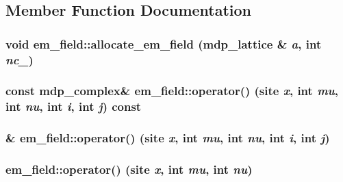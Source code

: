 \subsection{Member Function Documentation}
\hypertarget{classem__field_ae4f6727d2b31a8d7eec93bf3506c92fb}{
\subsubsection[{allocate\_\-em\_\-field}]{\setlength{\rightskip}{0pt plus 5cm}void em\_\-field::allocate\_\-em\_\-field ({\bf mdp\_\-lattice} \& {\em a}, \/  int {\em nc\_\-})}}
\label{classem__field_ae4f6727d2b31a8d7eec93bf3506c92fb}
\hypertarget{classem__field_a68b499892a9404f8b469677e28506180}{
\subsubsection[{operator()}]{\setlength{\rightskip}{0pt plus 5cm}const {\bf mdp\_\-complex}\& em\_\-field::operator() (site {\em x}, \/  int {\em mu}, \/  int {\em nu}, \/  int {\em i}, \/  int {\em j}) const}}
\label{classem__field_a68b499892a9404f8b469677e28506180}
\hypertarget{classem__field_ab5063637e3b890ae95ea46b8458c6fc7}{
\subsubsection[{operator()}]{\& em\_\-field::operator() (site {\em x}, \/  int {\em mu}, \/  int {\em nu}, \/  int {\em i}, \/  int {\em j})}}
\label{classem__field_ab5063637e3b890ae95ea46b8458c6fc7}
\hypertarget{classem__field_a4afce0ed26593545c4a61892880823bc}{
\subsubsection[{operator()}]{ em\_\-field::operator() (site {\em x}, \/  int {\em mu}, \/  int {\em nu})}}
